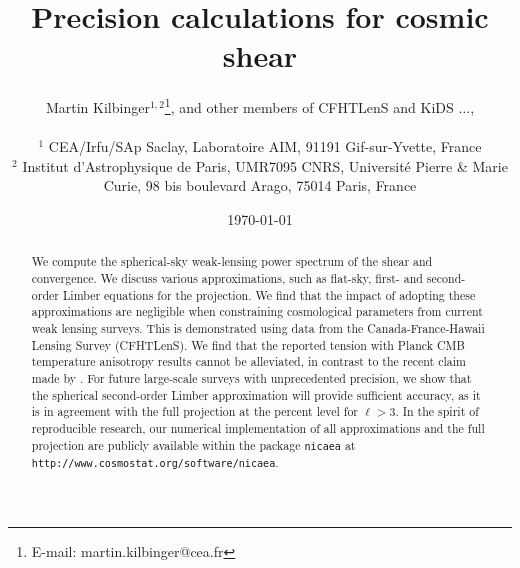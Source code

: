 \documentclass[fleqn,usenatbib]{mnras} %
\begin{document}

\title[Precision calculations for cosmic shear]{Precision calculations for cosmic shear}  %

\author[M.~Kilbinger et~al.]
 {
  \parbox[h]{\textwidth}
  {
      Martin Kilbinger$^{1,2}$\thanks{E-mail: martin.kilbinger@cea.fr},
      and other members of CFHTLenS and KiDS
      $\ldots$,
  }
  \vspace*{10pt} \\
  \hspace{-.1cm}$^1$ CEA/Irfu/SAp Saclay, Laboratoire AIM, 91191 Gif-sur-Yvette, France\\
  \hspace{-.1cm}$^2$ Institut d'Astrophysique de Paris, UMR7095 CNRS,
           Universit\'e Pierre \& Marie Curie, 98 bis boulevard Arago, 75014 Paris,
           France \\
 }

\voffset-0.50in


\date{\today}

\pagerange{\pageref{firstpage}--\pageref{lastpage}} 

\maketitle

\label{firstpage}


\begin{abstract}

We compute the spherical-sky weak-lensing power spectrum of the shear and
convergence. We discuss various approximations, such as flat-sky, first- and
second-order Limber equations for the projection. We find that the impact of adopting 
these approximations are negligible when constraining cosmological parameters from 
current weak lensing surveys.
This is demonstrated using data from the Canada-France-Hawaii Lensing Survey (CFHTLenS). 
We find that the reported tension with Planck CMB temperature anisotropy results cannot be alleviated, in
contrast to the recent claim made by \citet{2016arXiv161104954K}. 
For future large-scale surveys with unprecedented precision, we show that the spherical
second-order Limber approximation will provide sufficient accuracy, as it is in 
agreement with the full projection at the percent level for $\ell > 3$.  
In the spirit of reproducible research, our numerical implementation of all approximations
and the full projection are publicly available within the package
\texttt{nicaea} at \texttt{http://www.cosmostat.org/software/nicaea}.

\end{abstract}
\end{document}
